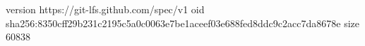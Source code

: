 version https://git-lfs.github.com/spec/v1
oid sha256:8350cff29b231c2195c5a0c0063e7be1aceef03e688fed8ddc9c2acc7da8678e
size 60838
